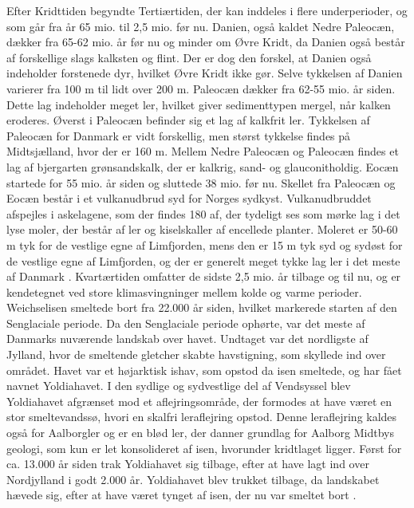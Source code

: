 Efter Kridttiden begyndte Tertiærtiden, der kan inddeles i flere underperioder, og som går fra år 65 mio. til 2,5 mio. før nu. Danien, også kaldet Nedre Paleocæn, dækker fra 65-62 mio. år før nu og minder om Øvre Kridt, da Danien også består af forskellige slags kalksten og flint. Der er dog den forskel, at Danien også indeholder forstenede dyr, hvilket Øvre Kridt ikke gør. Selve tykkelsen af Danien varierer fra 100 m til lidt over 200 m. Paleocæn dækker fra 62-55 mio. år siden. Dette lag indeholder meget ler, hvilket giver sedimenttypen mergel, når kalken eroderes. Øverst i Paleocæn befinder sig et lag af kalkfrit ler. Tykkelsen af Paleocæn for Danmark er vidt forskellig, men størst tykkelse findes på Midtsjælland, hvor der er 160 m. Mellem Nedre Paleocæn og Paleocæn findes et lag af bjergarten grønsandskalk, der er kalkrig, sand- og glauconitholdig.
\newline \indent{     }  Eocæn startede for 55 mio. år siden og sluttede 38 mio. før nu. Skellet fra Paleocæn og Eocæn består i et vulkanudbrud syd for Norges sydkyst. Vulkanudbruddet afspejles i askelagene, som der findes 180 af, der tydeligt ses som mørke lag i det lyse moler, der består af ler og kiselskaller af encellede planter. Moleret er 50-60 m tyk for de vestlige egne af Limfjorden, mens den er 15 m tyk syd og sydøst for de vestlige egne af Limfjorden, og der er generelt meget tykke lag ler i det meste af Danmark \citep{geopdf}.
\newline
\newline
Kvartærtiden omfatter de sidste 2,5 mio. år tilbage og til nu, og er kendetegnet ved store klimasvingninger mellem kolde og varme perioder. Weichselisen smeltede bort fra 22.000 år siden, hvilket markerede starten af den Senglaciale periode. Da den Senglaciale periode ophørte, var det meste af Danmarks nuværende landskab over havet. Undtaget var det nordligste af Jylland, hvor de smeltende gletcher skabte havstigning, som skyllede ind over området. Havet var et højarktisk ishav, som opstod da isen smeltede, og har fået navnet Yoldiahavet. I den sydlige og sydvestlige del af Vendsyssel blev Yoldiahavet afgrænset mod et aflejringsområde, der formodes at have været en stor smeltevandssø, hvori en skalfri leraflejring opstod. Denne leraflejring kaldes også for Aalborgler og er en blød ler, der danner grundlag for Aalborg Midtbys geologi, som kun er let konsolideret af isen, hvorunder kridtlaget ligger. Først for ca. 13.000 år siden trak Yoldiahavet sig tilbage, efter at have lagt ind over Nordjylland i godt 2.000 år. Yoldiahavet blev trukket tilbage, da landskabet hævede sig, efter at have været tynget af isen, der nu var smeltet bort \citep{geopdf}.
